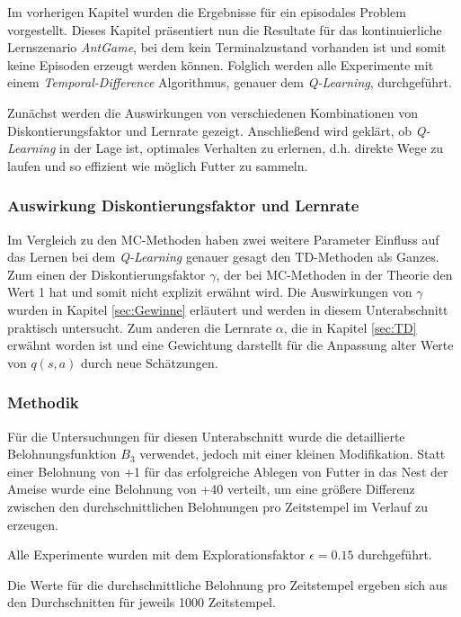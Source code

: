 Im vorherigen Kapitel wurden die Ergebnisse für ein episodales Problem vorgestellt. Dieses Kapitel präsentiert nun die Resultate für das kontinuierliche Lernszenario \textit{AntGame}, bei dem kein Terminalzustand vorhanden ist und somit keine Episoden erzeugt werden können. Folglich werden alle Experimente mit einem \textit{Temporal-Difference} Algorithmus, genauer dem \textit{Q-Learning}, durchgeführt. 
\par 
Zunächst werden die Auswirkungen von verschiedenen Kombinationen von Diskontierungsfaktor und Lernrate gezeigt. Anschließend wird geklärt, ob \textit{Q-Learning} in der Lage ist, optimales Verhalten zu erlernen, d.h. direkte Wege zu laufen und so effizient wie möglich Futter zu sammeln.


\subsubsection{Auswirkung Diskontierungsfaktor und Lernrate}
Im Vergleich zu den MC-Methoden haben zwei weitere Parameter Einfluss auf das Lernen bei dem \textit{Q-Learning} genauer gesagt den TD-Methoden als Ganzes. Zum einen der Diskontierungsfaktor $\gamma$, der bei MC-Methoden in der Theorie den Wert 1 hat und somit nicht explizit erwähnt wird. Die Auswirkungen von $\gamma$ wurden in Kapitel \ref{sec:Gewinne} erläutert und werden in diesem Unterabschnitt praktisch untersucht. Zum anderen die Lernrate $\alpha$, die in Kapitel \ref{sec:TD} erwähnt worden ist und eine Gewichtung darstellt für die Anpassung alter Werte von $q(s,a)$ durch neue Schätzungen.

\subsubsection*{Methodik}
Für die Untersuchungen für diesen Unterabschnitt wurde die detaillierte Belohnungsfunktion $B_3$ verwendet, jedoch mit einer kleinen Modifikation. Statt einer Belohnung von +1 für das erfolgreiche Ablegen von Futter in das Nest der Ameise wurde eine Belohnung von +40 verteilt, um eine größere Differenz zwischen den durchschnittlichen Belohnungen pro Zeitstempel im Verlauf zu erzeugen.
\par 
Alle Experimente wurden mit dem Explorationsfaktor $\epsilon = 0.15$ durchgeführt.
\par 
Die Werte für die durchschnittliche Belohnung pro Zeitstempel ergeben sich aus den Durchschnitten für jeweils 1000 Zeitstempel.

